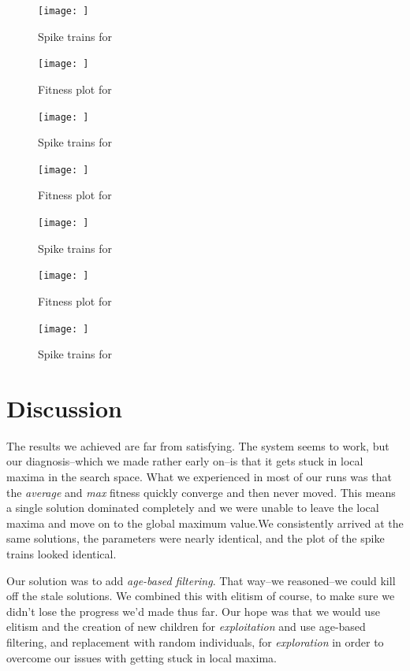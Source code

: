 \documentclass[a4paper]{article}
\begin{document}
\begin{figure}[htb!]
  \centering
  \texttt{[image: ]}
  \caption{Spike trains for}
\end{figure}

\begin{figure}[htb!]
  \centering
  \texttt{[image: ]}
  \caption{Fitness plot for}
\end{figure}

\begin{figure}[htb!]
  \centering
  \texttt{[image: ]}
  \caption{Spike trains for}
\end{figure}

\begin{figure}[htb!]
  \centering
  \texttt{[image: ]}
  \caption{Fitness plot for}
\end{figure}

\begin{figure}[htb!]
  \centering
  \texttt{[image: ]}
  \caption{Spike trains for}
\end{figure}

\begin{figure}[htb!]
  \centering
  \texttt{[image: ]}
  \caption{Fitness plot for}
\end{figure}

\begin{figure}[htb!]
  \centering
  \texttt{[image: ]}
  \caption{Spike trains for}
\end{figure}

\section{Discussion}
\label{sec:discussion}

The results we achieved are far from satisfying. The system seems to work, but our diagnosis--which we made rather early on--is that it gets stuck in local maxima in the search space. What we experienced in most of our runs was that the \textit{average} and \textit{max} fitness quickly converge and then never moved. This means a single solution dominated completely and we were unable to leave the local maxima and move on to the global maximum value.We consistently arrived at the same solutions, the parameters were nearly identical, and the plot of the spike trains looked identical.

Our solution was to add \textit{age-based filtering}. That way--we reasoned--we could kill off the stale solutions. We combined this with elitism of course, to make sure we didn't lose the progress we'd made thus far. Our hope was that we would use elitism and the creation of new children for \textit{exploitation} and use age-based filtering, and replacement with random individuals, for \textit{exploration} in order to  overcome our issues with getting stuck in local maxima.
\end{document}
